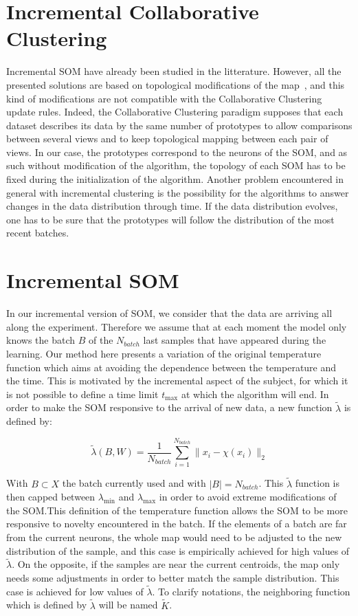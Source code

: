 	\section{Incremental Collaborative Clustering}
    Incremental SOM have already been studied in the litterature. However, all the presented solutions are based on topological modifications of the map~\cite{deng2000esom,paplinski2012incremental}, and this kind of modifications are not compatible with the Collaborative Clustering update rules. Indeed, the Collaborative Clustering paradigm supposes that each dataset describes its data by the same number of prototypes to allow comparisons between several views and to keep topological mapping between each pair of views. In our case, the prototypes correspond to the neurons of the SOM, and as such without modification of the algorithm, the topology of each SOM has to be fixed during the initialization of the algorithm. Another problem encountered in general with incremental clustering is the possibility for the algorithms to answer changes in the data distribution through time. If the data distribution evolves, one has to be sure that the prototypes will follow the distribution of the most recent batches.
	
	\section{Incremental SOM}
\label{sectionisom}
	In our incremental version of SOM, we consider that the data are arriving all along the experiment. Therefore we assume that at each moment the model only knows the batch $B$ of the $N_{batch}$ last samples that have appeared during the learning.
	Our method here presents a variation of the original temperature function which aims at avoiding the dependence between the temperature and the time. This is motivated by the incremental aspect of the subject, for which it is not possible to define a time limit $t_{\max}$ at which the algorithm will end. In order to make the SOM responsive to the arrival of new data, a new function $\widetilde{\lambda}$ is defined by:
	
	\begin{equation}
	\widetilde{\lambda}(B, W) = \frac{1}{N_{batch}}\sum_{i=1}^{N_{batch}}\|x_i - \chi(x_i)\|_2
	\end{equation}
	
	With $B \subset X$ the batch currently used and with $|B|=N_{batch}$. This $\widetilde{\lambda}$ function is then capped between $\lambda_{\min}$ and $\lambda_{\max}$ in order to avoid extreme modifications of the SOM.\@ This definition of the temperature function allows the SOM to be more responsive to novelty encountered in the batch. If the elements of a batch are far from the current neurons, the whole map would need to be adjusted to the new distribution of the sample, and this case is empirically achieved for high values of $\widetilde{\lambda}$. On the opposite, if the samples are near the current centroids, the map only needs some adjustments in order to better match the sample distribution. This case is achieved for low values of $\widetilde{\lambda}$. To clarify notations, the neighboring function which is defined by $\widetilde{\lambda}$ will be named $\widetilde{K}$.
	
